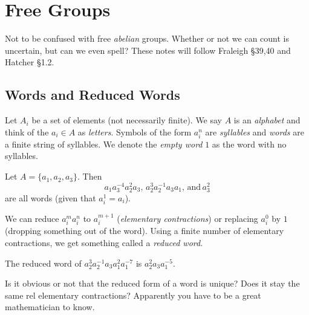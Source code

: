 \section{Free Groups}
Not to be confused with free \emph{abelian} groups. Whether or not we can count is uncertain, but can we even spell? These notes will follow Fraleigh \S 39,40 and Hatcher \S 1.2.
\subsection{Words and Reduced Words}
Let $A_i$ be a set of elements (not necessarily finite). We say $A$ is an \emph{alphabet} and think of the $a_i\in A$ as \emph{letters}. Symbols of the form $a_{i}^{n}$ are \emph{syllables} and \emph{words} are a finite string of syllables. We denote the \emph{empty word} $1$ as the word with no syllables.
\begin{example}
    Let $A=\{a_1,a_2,a_3\}.$ Then \[
        a_1a_3^{-4}a_2^{2}a_3, \, a_2^{3}a_2^{-1}a_3a_1, \, \text{and} \, a_3^2
    \] are all words (given that $a_i^{1}=a_i$).
\end{example}
We can reduce $a_i^{m}a_i^n$ to $a_i^{m+1}$ (\emph{elementary contractions}) or replacing $a_i^{0}$ by $1$ (dropping something out of the word). Using a finite number of elementary contractions, we get something called a \emph{reduced word}.
\begin{example}
    The reduced word of $a_2^{3}a_2^{-1}a_3a_1^2a_1^{-7}$ is $a_2^2a_3a_1^{-5}$.
\end{example}
Is it obvious or not that the reduced form of a word is unique? Does it stay the same rel elementary contractions? Apparently you have to be a great mathematician to know.
